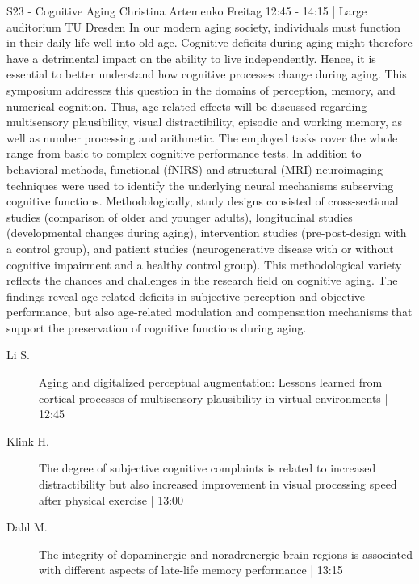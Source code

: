 
            \begin{symposium}
            {S23 - Cognitive Aging}
            {Christina Artemenko}
            {Freitag 12:45 - 14:15 | Large auditorium}
            {TU Dresden}
            In our modern aging society, individuals must function in their daily life well into old age. Cognitive deficits during aging might therefore have a detrimental impact on the ability to live independently. Hence, it is essential to better understand how cognitive processes change during aging.
This symposium addresses this question in the domains of perception, memory, and numerical cognition. Thus, age-related effects will be discussed regarding multisensory plausibility, visual distractibility, episodic and working memory, as well as number processing and arithmetic. The employed tasks cover the whole range from basic to complex cognitive performance tests.
In addition to behavioral methods, functional (fNIRS) and structural (MRI) neuroimaging techniques were used to identify the underlying neural mechanisms subserving cognitive functions. Methodologically, study designs consisted of cross-sectional studies (comparison of older and younger adults), longitudinal studies (developmental changes during aging), intervention studies (pre-post-design with a control group), and patient studies (neurogenerative disease with or without cognitive impairment and a healthy control group). This methodological variety reflects the chances and challenges in the research field on cognitive aging.
The findings reveal age-related deficits in subjective perception and objective performance, but also age-related modulation and compensation mechanisms that support the preservation of cognitive functions during aging.
            \begin{description}    
            
                \item [ Li S.] Aging and digitalized perceptual augmentation: Lessons learned from cortical processes of multisensory plausibility in virtual environments \textcolor{mygray}{ | 12:45}    
                
                \item [ Klink H.] The degree of subjective cognitive complaints is related to increased distractibility but also increased improvement in visual processing speed after physical exercise \textcolor{mygray}{ | 13:00}    
                
                \item [ Dahl M.] The integrity of dopaminergic and noradrenergic brain regions is associated with different aspects of late-life memory performance \textcolor{mygray}{ | 13:15}    
                

\end{description}
\end{symposium}
